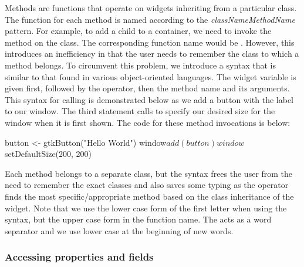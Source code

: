 \documentclass[article,shortnames]{jss}
\begin{document}
Methods are functions that operate on widgets inheriting from a
particular class.  The  function for each  method
is named according to the \emph{classNameMethodName} pattern. For
example, to add a child to a container, we need to invoke the
 method on the  class.  The corresponding
function name would be .  However, this
introduces an inefficiency in that the user needs to remember the
class to which a method belongs. To circumvent this problem, we
introduce a syntax that is similar to that found in various
object-oriented languages. The widget variable is given first,
followed by the \code{\$} operator, then the method name and its
arguments. This syntax for calling  is
demonstrated below as we add a button with the label  to our window.  The third statement calls
 to specify our desired size for the
window when it is first shown. The code for these method invocations
is below:
\begin{Code}
button <- gtkButton("Hello World")
window$add(button)
window$setDefaultSize(200, 200)
\end{Code}
Each method belongs to a separate
class, but the syntax frees the user from the need to remember the
exact classes and also saves some typing as 
the \code{\$} operator finds the most specific/appropriate method based on
the class inheritance of the widget.
Note that we use the lower case form of the first letter when using
the \code{\$} syntax, but the upper case form in the
 function name. The \code{\$} acts as a word
separator and we use lower case at the beginning of new words.



\subsubsection{Accessing properties and fields}
\end{document}

